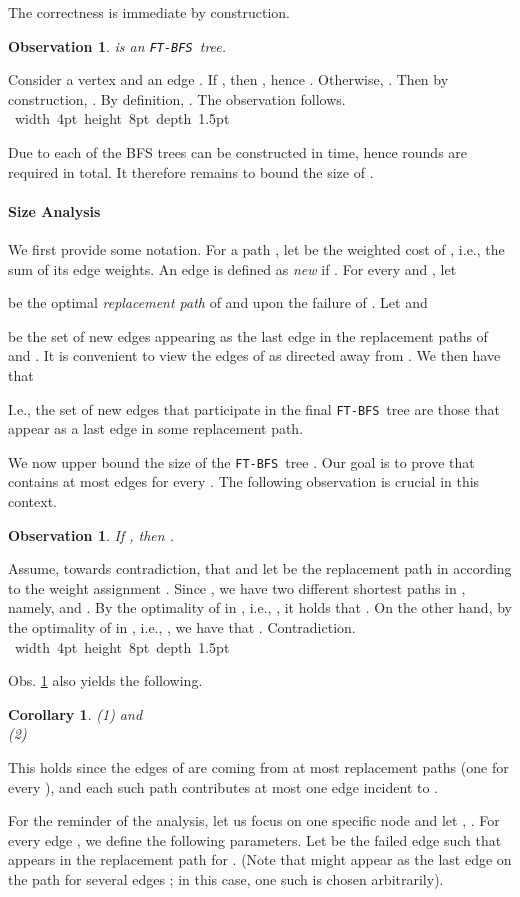 \documentclass[12pt]{article}
\newtheorem{observation}[theorem]{Observation}
\newtheorem{corollary}[theorem]{Corollary}
\def\Proof{\par\noindent{\bf Proof:~}}
\def\blackslug{\hbox{\hskip 1pt \vrule width 4pt height 8pt
    depth 1.5pt \hskip 1pt}}
\def\QED{\quad\blackslug\lower 8.5pt\null\par}
\def\FTBFS{\mbox{\tt FT-BFS}}
\begin{document}
The correctness is immediate by construction.
\begin{observation}
\label{obs:correctness}
 is an \FTBFS\ tree.
\end{observation}
\def\APPENDUPCORRECT{
\Proof
Consider a vertex  and an edge .
If ,
then , hence . Otherwise, . Then by construction, . By definition, . The observation follows.
\QED
}\APPENDUPCORRECT


Due to \cite{TH99} each of the  BFS trees  can be constructed in  time, hence  rounds are required in total.
It therefore remains to bound the size of .

\paragraph{Size Analysis}
We first provide some notation.
For a path , let  be the weighted cost of , i.e., the sum of its edge weights.
An edge  is defined as \emph{new} if .
For every  and , let

be the optimal \emph{replacement path} of  and  upon
the failure of .
Let  and

be the set of  new edges appearing as the last edge in the replacement paths  of  and .
It is convenient to view the edges of  as directed away from .
We then have that

I.e., the set of new edges that participate in the final \FTBFS\ tree 
are those that appear as a last edge in some replacement path.
\par We now upper bound the size of the \FTBFS\ tree .
Our goal is to prove that  contains at most  edges for every .
The following observation is crucial in this context.
\begin{observation}
\label{obs:new_edge}
If , then
.
\end{observation}
\def\APPENDONENEWEDGE{
\Proof
Assume, towards contradiction, that  and let
 be the  replacement path in
 according to the weight assignment .
Since ,
we have two different  shortest paths in , namely,
 and
. By the optimality of  in , i.e.,
,
it holds that .
On the other hand, by the optimality of  in , i.e.,
, we have that
. Contradiction.
\QED
}\APPENDONENEWEDGE

Obs. \ref{obs:new_edge} also yields the following.
\begin{corollary}
(1) 
and \\
(2) 
\end{corollary}
This holds since the edges of  are coming from at most
 replacement paths 
(one for every ),
and each such path contributes at most one edge incident to .
\par For the reminder of the analysis, let us focus on
one specific node  and let  , .
For every edge , we define the following parameters.
Let  be the failed edge such that 
appears in the replacement path  for .
(Note that  might appear as the last edge on the path 
for several edges ; in this case, one such  is chosen arbitrarily).
\end{document}
